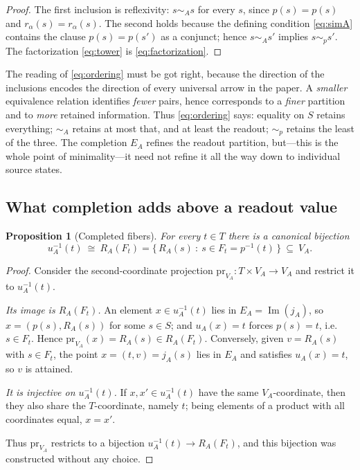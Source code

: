\documentclass[11pt,reqno]{amsart}
\theoremstyle{plain}
\newtheorem{proposition}[theorem]{Proposition}
\theoremstyle{definition}
\theoremstyle{remark}
\numberwithin{equation}{section}
\DeclareMathOperator{\Image}{Im}
\begin{document}
\begin{proof}
The first inclusion is reflexivity: $s\sim_A s$ for every $s$, since $p(s)=p(s)$ and
$r_\alpha(s)=r_\alpha(s)$. The second holds because the defining condition \eqref{eq:simA} contains
the clause $p(s)=p(s')$ as a conjunct; hence $s\sim_A s'$ implies $s\sim_p s'$. The factorization
\eqref{eq:tower} is \eqref{eq:factorization}.
\end{proof}

The reading of \eqref{eq:ordering} must be got right, because the direction of the inclusions
encodes the direction of every universal arrow in the paper. A \emph{smaller} equivalence relation
identifies \emph{fewer} pairs, hence corresponds to a \emph{finer} partition and to \emph{more}
retained information. Thus \eqref{eq:ordering} says: equality on $S$ retains everything;
$\sim_A$ retains at most that, and at least the readout; $\sim_p$ retains the least of the three.
The completion $E_A$ refines the readout partition, but---this is the whole point of minimality---it
need not refine it all the way down to individual source states.

\subsection{What completion adds above a readout value}

\begin{proposition}[Completed fibers]
\label{prop:fibers}
For every $t\in T$ there is a canonical bijection
\begin{equation}
\label{eq:fibers}
u_A^{-1}(t)\ \cong\ R_A(F_t)=\{\,R_A(s)\ :\ s\in F_t=p^{-1}(t)\,\}\ \subseteq\ V_A .
\end{equation}
\end{proposition}

\begin{proof}
Consider the second-coordinate projection $\mathrm{pr}_{V_A}\colon T\times V_A\to V_A$ and restrict
it to $u_A^{-1}(t)$.

\emph{Its image is $R_A(F_t)$.} An element $x\in u_A^{-1}(t)$ lies in $E_A=\Image(j_A)$, so
$x=(p(s),R_A(s))$ for some $s\in S$; and $u_A(x)=t$ forces $p(s)=t$, i.e.\ $s\in F_t$. Hence
$\mathrm{pr}_{V_A}(x)=R_A(s)\in R_A(F_t)$. Conversely, given $v=R_A(s)$ with $s\in F_t$, the point
$x=(t,v)=j_A(s)$ lies in $E_A$ and satisfies $u_A(x)=t$, so $v$ is attained.

\emph{It is injective on $u_A^{-1}(t)$.} If $x,x'\in u_A^{-1}(t)$ have the same $V_A$-coordinate,
then they also share the $T$-coordinate, namely $t$; being elements of a product with all
coordinates equal, $x=x'$.

Thus $\mathrm{pr}_{V_A}$ restricts to a bijection $u_A^{-1}(t)\to R_A(F_t)$, and this bijection was
constructed without any choice.
\end{proof}
\end{document}
